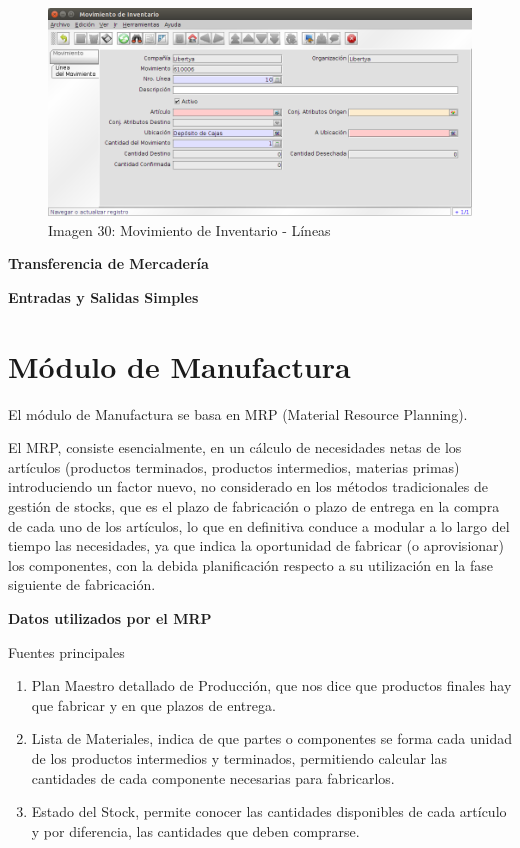 \documentclass[letterpaper,10pt,spanish]{sphinxmanual}
\begin{document}
\begin{figure}[htbp]
\centering
\capstart

\includegraphics{ly_mov_2.png}
\caption{Imagen 30: Movimiento de Inventario - Líneas}\end{figure}

\textbf{Transferencia de Mercadería}

\textbf{Entradas y Salidas Simples}


\chapter{Módulo de Manufactura}
\label{manufactura:modulo-de-manufactura}\label{manufactura::doc}
El módulo de Manufactura se basa en MRP (Material Resource Planning).

El MRP, consiste esencialmente, en un cálculo de necesidades netas de los artículos
(productos terminados, productos intermedios, materias primas) introduciendo un factor nuevo, no considerado en los métodos tradicionales de gestión de stocks, que es el plazo de fabricación o plazo de entrega en la compra de cada uno de los artículos, lo que en definitiva conduce a modular a lo largo del tiempo las necesidades, ya que indica la oportunidad de fabricar (o aprovisionar) los componentes, con la  debida planificación respecto a su utilización en la fase siguiente de fabricación.

\textbf{Datos utilizados por el MRP}

Fuentes principales
\begin{enumerate}
\item {} 
Plan Maestro detallado de Producción, que nos dice que productos finales hay que fabricar y en que plazos de entrega.

\item {} 
Lista de Materiales, indica de que partes o componentes se forma cada unidad de los productos intermedios y terminados, permitiendo calcular las cantidades de cada componente necesarias para fabricarlos.

\item {} 
Estado del Stock, permite conocer las cantidades disponibles de cada artículo y por diferencia, las cantidades que deben comprarse.

\end{enumerate}
\end{document}
